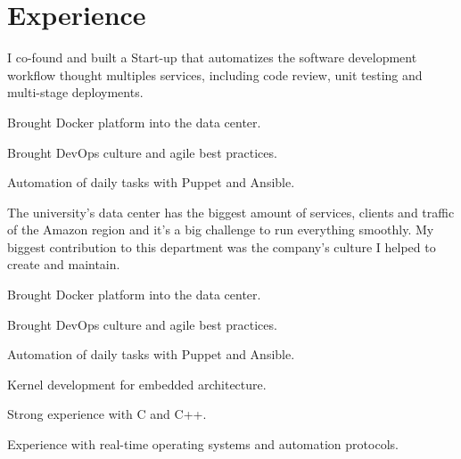 \documentclass[]{willianpaixao-resume}
\begin{document}
\hfill
\begin{minipage}[t]{0.64\textwidth}

\section{Experience}
\sectionsep

\sectionsep
I co-found and built a Start-up that automatizes the software development
workflow thought multiples services, including code review, unit testing and
multi-stage deployments.
\sectionsep
\begin{tightemize}
\item Brought Docker platform into the data center.
\item Brought DevOps culture and agile best practices.
\item Automation of daily tasks with Puppet and Ansible.
\end{tightemize}
\sectionsep

\sectionsep
The university's data center has the biggest amount of services, clients and
traffic of the Amazon region and it's a big challenge to run everything smoothly.
My biggest contribution to this department was the company's culture I helped to
create and maintain.
\sectionsep
\begin{tightemize}
\item Brought Docker platform into the data center.
\item Brought DevOps culture and agile best practices.
\item Automation of daily tasks with Puppet and Ansible.
\end{tightemize}
\sectionsep

\begin{tightemize}
\item Kernel development for embedded architecture.
\item Strong experience with C and C++.
\item Experience with real-time operating systems and automation protocols.
\end{tightemize}
\sectionsep


\end{minipage}
\end{document}
